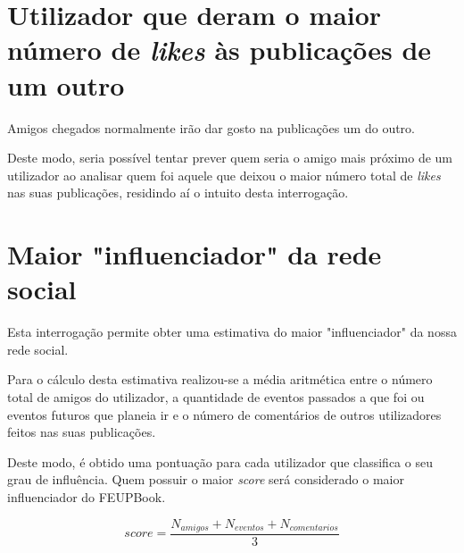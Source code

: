 \documentclass[12pt]{report}
\begin{document}
\begin{figure}[H]
    \centering
\end{figure}

\section{Utilizador que deram o maior número de \textit{likes} às publicações de um outro}

Amigos chegados normalmente irão dar gosto na publicações um do outro. \par

Deste modo, seria possível tentar prever quem seria o amigo mais próximo de um utilizador ao analisar quem foi aquele que deixou o maior número total de \textit{likes} nas suas publicações, residindo aí o intuito desta interrogação.

\section{Maior "influenciador" da rede social}

Esta interrogação permite obter uma estimativa do maior "influenciador" da nossa rede social. \par

Para o cálculo desta estimativa realizou-se a média aritmética entre o número total de amigos do utilizador, a quantidade de eventos passados a que foi ou eventos futuros que planeia ir e o número de comentários de outros utilizadores feitos nas suas publicações. \par 

Deste modo, é obtido uma pontuação para cada utilizador que classifica o seu grau de influência. Quem possuir o maior \textit{score} será considerado o maior influenciador do FEUPBook.

\begin{equation*}
    score = \frac{N_{amigos} + N_{eventos} + N_{comentarios}}{3}
\end{equation*}
\end{document}
